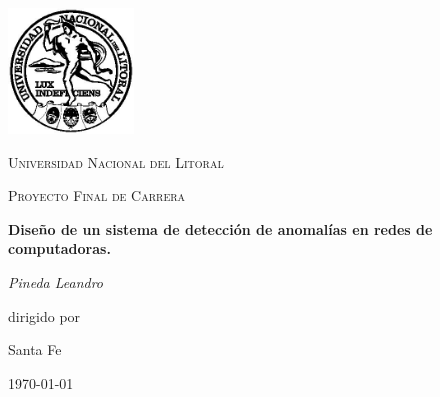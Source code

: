 \documentclass[a4paper,10pt, oneside]{book}
\begin{document}
\begin{titlepage}
	\centering
	\includegraphics[width=0.25\textwidth]{Universidad_del_Litoral}\par\vspace{1cm}
	{\scshape\LARGE Universidad Nacional del Litoral \par}
	\vspace{1cm}
	{\scshape\Large Proyecto Final de Carrera\par}
	\vspace{1.5cm}
	{\huge\bfseries Diseño de un sistema de detección de anomalías en redes de computadoras.\par}
	\vspace{2cm}
	{\Large\itshape Pineda Leandro\par}
	\vfill
	dirigido por\par
	

	\vfill
	
	
	
	\large Santa Fe\par
	{\large \today\par}
	
\end{titlepage}

\modulolinenumbers[5]





\newpage
 
\nocite{*}
\printbibliography
\end{document}
